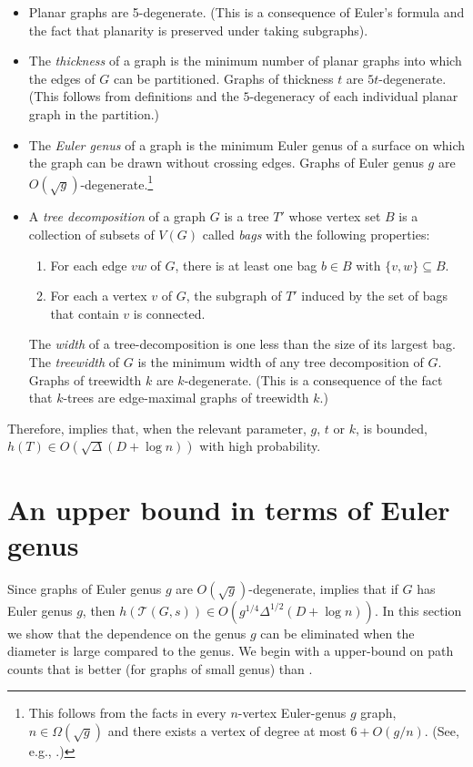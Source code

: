 \documentclass{patmorin}
\newcommand{\tcal}{\mathcal{T}}
\begin{document}
\begin{itemize}
  \item Planar graphs are 5-degenerate. (This is a consequence of Euler's
    formula and the fact that planarity is preserved under taking subgraphs).
  
  \item The \emph{thickness} of a graph is the minimum number of planar
    graphs into which the edges of $G$ can be partitioned. Graphs of
    thickness $t$ are $5t$-degenerate.  (This follows from definitions
    and the $5$-degeneracy of each individual planar graph in the
    partition.)

  \item The \emph{Euler genus} of a graph is the minimum Euler genus of
    a surface on which the graph can be drawn without crossing edges.
    Graphs of Euler genus $g$ are $O(\sqrt{g})$-degenerate.\footnote{This
    follows from the facts in every $n$-vertex Euler-genus $g$ graph,
    $n\in \Omega(\sqrt{g})$ and there exists a vertex of degree at most
    $6+O(g/n)$. (See, e.g., \cite[Lemma~7 and Theorem~2]{wolle.koster.ea:note}.)}

  \item A \emph{tree decomposition} of a graph $G$ is a tree $T'$ whose
  vertex set $B$ is a collection of subsets of $V(G)$ called \emph{bags}
  with the following properties:
  \begin{enumerate}
    \item For each edge $vw$ of $G$, there is at least one bag $b\in B$
      with $\{v,w\}\subseteq B$.
    \item For each a vertex $v$ of $G$, the subgraph of $T'$ induced by
      the set of bags that contain $v$ is connected.
  \end{enumerate}
  The \emph{width} of a tree-decomposition is one less than the size
  of its largest bag.  The \emph{treewidth} of $G$ is the minimum
  width of any tree decomposition of $G$.
  Graphs of treewidth $k$ are $k$-degenerate. (This is a consequence
  of the fact that $k$-trees are edge-maximal graphs of treewidth $k$.)
\end{itemize} 

Therefore,  implies that,
when the relevant parameter, $g$, $t$ or $k$, is bounded, $h(T)\in
O(\sqrt{\Delta}(D+\log n))$ with high probability.  

\section{An upper bound in terms of Euler genus}
Since graphs of Euler genus $g$ are $O(\sqrt{g})$-degenerate,
 implies that if  $G$ has Euler genus
$g$, then $h(\tcal(G,s))\in O(g^{1/4}\Delta^{1/2}(D+\log n))$.  In this section we show that the
dependence on the genus $g$ can be eliminated when the diameter is large
compared to the genus.  We begin with a upper-bound on path counts that
is better (for graphs of small genus) than .
\end{document}
